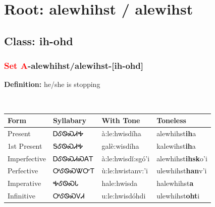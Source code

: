 \needspace{4in}
\section*{Root: alewhihst / alewihst}
\nopagebreak
{}
\needspace{3in}
\subsection*{Class: ih-ohd}
\nopagebreak
\needspace{2in}
\subsubsection*{\textcolor{Red}{Set A}{-}\textbf{alewhihst/alewihst}{-}[ih-ohd]}
\nopagebreak
\textbf{Definition: } he/she is stopping
\\[0.5em]
\begin{tabularx}{\textwidth}{l X X X}%
\toprule%
\textbf{Form}&\textbf{Syllabary}&\textbf{With Tone}&\textbf{Toneless}\\%
\midrule%
Present&ᎠᎴᏫᏍᏗᎭ&à:le:hwisdíha&alewhihst\textbf{ih}a\\%
1st Present&ᎦᎴᏫᏍᏗᎭ&galè:wisdíha&kalewihst\textbf{ih}a\\%
Imperfective&ᎠᎴᏫᏍᏗᏍᎪᎢ&à:le:hwisdǐ:sgó’i&alewhihst\textbf{ihsk}o'i\\%
Perfective&ᎤᎴᏫᏍᏔᏅᎢ&ù:le:hwistanv:’i&ulewhihst\textbf{han}v'i\\%
Imperative&ᎭᎴᏫᏍᏓ&hale:hwisda&halewhihst\textbf{a}\\%
Infinitive&ᎤᎴᏫᏍᏙᏗ&u:le:hwisdóhdi&ulewhihst\textbf{oht}i\\%
\bottomrule%
\end{tabularx}
\\[1em]